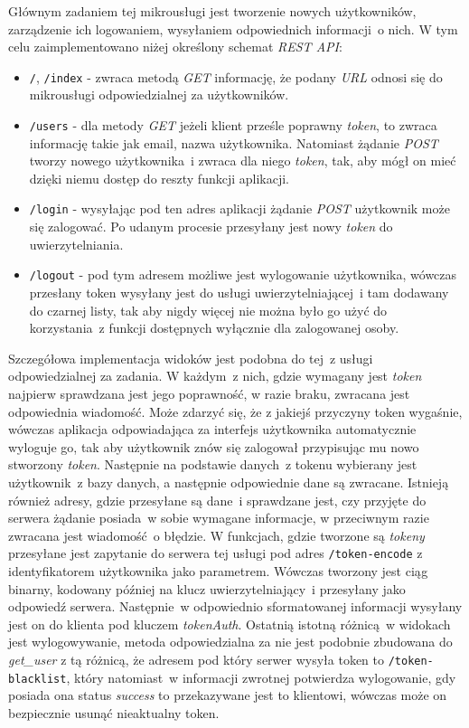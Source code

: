 Głównym zadaniem tej mikrousługi jest tworzenie nowych użytkowników, zarządzenie ich logowaniem, wysyłaniem odpowiednich informacji~o nich. W tym celu zaimplementowano niżej określony schemat \textit{REST API}:
\begin{itemize}
  \item \verb|/|, \verb|/index| - zwraca metodą \textit{GET} informację, że podany \textit{URL} odnosi się do mikrousługi odpowiedzialnej za użytkowników.
  \item \verb|/users| - dla metody \textit{GET} jeżeli klient prześle poprawny \textit{token}, to zwraca informację takie jak email, nazwa użytkownika. Natomiast żądanie \textit{POST} tworzy nowego użytkownika~i zwraca dla niego \textit{token}, tak, aby mógł on mieć dzięki niemu dostęp do reszty funkcji aplikacji.
  \item \verb|/login| - wysyłając pod ten adres aplikacji żądanie \textit{POST} użytkownik może się zalogować. Po udanym procesie przesyłany jest nowy \textit{token} do uwierzytelniania.
  \item \verb|/logout| - pod tym adresem możliwe jest wylogowanie użytkownika, wówczas przesłany token wysyłany jest do usługi uwierzytelniającej~i tam dodawany do czarnej listy, tak aby nigdy więcej nie można było go użyć do korzystania~z funkcji dostępnych wyłącznie dla zalogowanej osoby.
\end{itemize}

Szczegółowa implementacja widoków jest podobna do tej~z usługi odpowiedzialnej za zadania. W każdym~z nich, gdzie wymagany jest \textit{token} najpierw sprawdzana jest jego poprawność, w razie braku,  zwracana jest odpowiednia wiadomość. Może zdarzyć się, że z jakiejś przyczyny token wygaśnie, wówczas aplikacja odpowiadająca za interfejs użytkownika automatycznie wyloguje go, tak aby użytkownik znów się zalogował przypisując mu nowo stworzony \textit{token}. Następnie na podstawie danych~z tokenu wybierany jest użytkownik~z bazy danych, a następnie odpowiednie dane są zwracane. Istnieją również adresy, gdzie przesyłane są dane~i sprawdzane jest, czy przyjęte do serwera żądanie posiada~w sobie wymagane informacje, w przeciwnym razie zwracana jest wiadomość~o błędzie. W funkcjach, gdzie tworzone są \textit{tokeny} przesyłane jest zapytanie do serwera tej usługi pod adres \verb|/token-encode| z identyfikatorem użytkownika jako parametrem. Wówczas tworzony jest ciąg binarny, kodowany później na klucz uwierzytelniający~i przesyłany jako odpowiedź serwera. Następnie~w odpowiednio sformatowanej informacji wysyłany jest on do klienta pod kluczem \textit{tokenAuth}.
Ostatnią istotną różnicą~w widokach jest wylogowywanie, metoda odpowiedzialna za nie jest podobnie zbudowana do \textit{get\_user} z tą różnicą, że adresem pod który serwer wysyła token to \verb|/token-blacklist|, który natomiast~w informacji zwrotnej potwierdza wylogowanie, gdy posiada ona status \textit{success} to przekazywane jest to klientowi, wówczas może on bezpiecznie usunąć nieaktualny token.

